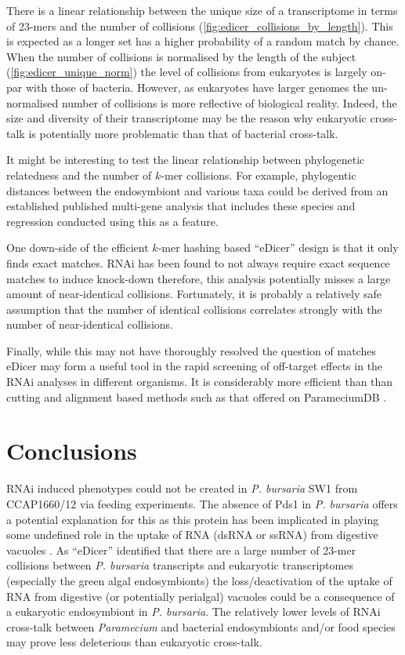 There is a linear relationship between the unique size of a transcriptome
in terms of 23-mers and the number of collisions (\cref{fig:edicer_collisions_by_length}).  
This is expected
as a longer set has a higher probability of a random match by chance.
When the number of collisions is normalised by the length of the subject (\cref{fig:edicer_unique_norm})
the level of collisions from eukaryotes is largely on-par with
those of bacteria.  However, as eukaryotes have larger genomes
the un-normalised number of collisions is more reflective of biological
reality.  Indeed, the size and diversity of their transcriptome
may be the reason why eukaryotic cross-talk is potentially
more problematic than that of bacterial cross-talk.


It might be interesting to test the linear relationship between phylogenetic
relatedness and the number of \(k\)-mer collisions.  For example, phylogentic distances
between the endosymbiont and various taxa could be derived from an established
published multi-gene analysis that includes these species and regression
conducted using this as a feature. 

One down-side of the efficient \(k\)-mer hashing based ``eDicer'' design is that
it only finds exact matches.  RNAi has been found to not always require exact
sequence matches to induce knock-down \citep{Elbashir2001} therefore,
this analysis potentially misses a large amount of near-identical collisions.
Fortunately, it is probably a relatively safe assumption that the number
of identical collisions correlates strongly with the number of near-identical collisions.

Finally, while this may not have thoroughly resolved the question of matches
eDicer may form a useful tool in the rapid screening of off-target effects
in the RNAi analyses in different organisms.   It is considerably
more efficient than than cutting and alignment based methods such as that
offered on ParameciumDB \citep{Arnaiz2011}.

\section{Conclusions}

RNAi induced phenotypes could not be created in \textit{P. bursaria} SW1 from CCAP1660/12
via feeding experiments.  The absence of Pds1 in \textit{P. bursaria} offers a potential 
explanation for this as this protein has been implicated in playing some undefined role
in the uptake of RNA (dsRNA or ssRNA) from digestive vacuoles \citep{Carradec2015}.
As ``eDicer'' identified that there are a large number of 23-mer collisions
between \textit{P. bursaria} transcripts and eukaryotic transcriptomes (especially
the green algal endosymbionts) the loss/deactivation of the uptake of RNA from 
digestive (or potentially perialgal) vacuoles could be a consequence of 
a eukaryotic endosymbiont in \textit{P. bursaria}.  
The relatively lower levels of RNAi cross-talk between
\textit{Paramecium} and bacterial endosymbionts and/or food species may prove
less deleterious than eukaryotic cross-talk. 

